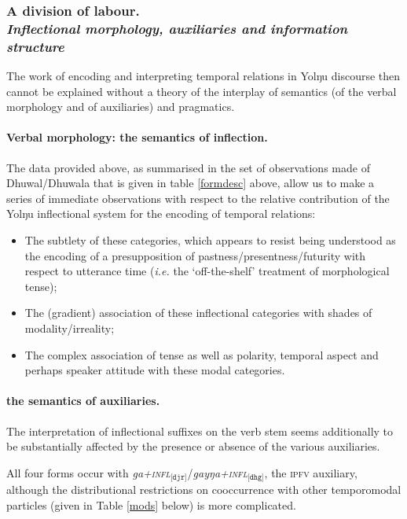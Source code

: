 \documentclass[12pt]{article}
\begin{document}
\subsubsection{A division of labour.\\\textit{Inflectional morphology, auxiliaries and information structure}}

The work of encoding and interpreting temporal relations in Yolŋu discourse then cannot be explained without a theory of the interplay of semantics (of the verbal morphology and of auxiliaries) and pragmatics.

\paragraph{Verbal morphology: the semantics of inflection.} The data provided above, as summarised in the set of observations made of Dhuwal/Dhuwala that is given in table \ref{formdesc} above, allow us to make a series of immediate observations with respect to the relative contribution of the Yolŋu inflectional system for the encoding of temporal relations:
\begin{itemize}
	\item The subtlety of these categories, which appears to resist being understood as the encoding of a presupposition of pastness/presentness/futurity with respect to utterance time (\textit{i.e.} the `off-the-shelf' treatment of morphological tense);
	\item The (gradient) association of these inflectional categories with shades of modality/irreality;
	\item The complex association of tense as well as polarity, temporal aspect and perhaps speaker attitude with these modal categories.
\end{itemize}
\paragraph{the semantics of auxiliaries.} 
The interpretation of inflectional suffixes on the verb stem seems additionally to be substantially affected by the presence or absence of the various auxiliaries.

All four forms occur with \textit{ga+\textsc{infl}}$_{\texttt{[djr]}}$/\textit{gayŋa+\textsc{infl}}$_{\texttt{[dhg]}}$, the \textsc{ipfv} auxiliary, although the distributional restrictions on cooccurrence with other temporomodal particles (given in Table \ref{mods} below) is more complicated.
\end{document}
